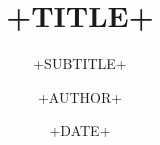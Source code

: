 \documentclass{beamer}
\title{{{+TITLE+}}}
\subtitle{{{+SUBTITLE+}}}
\author{{{+AUTHOR+}}}
\institute{{{+INSTITUTE+}}}
\date{{{+DATE+}}}
\begin{document}
    \begin{frame}
        \maketitle
    \end{frame}
\end{document}
